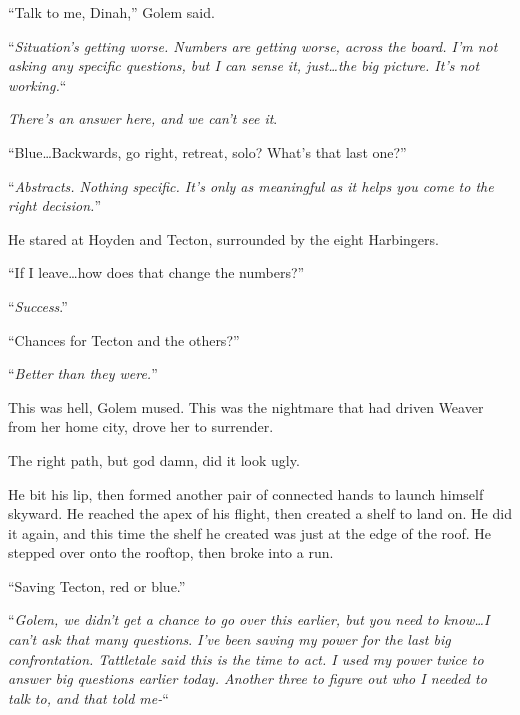 ``Talk to me, Dinah,'' Golem said.



``\emph{Situation's getting worse.  Numbers are getting worse, across the board.  I'm not asking any specific questions, but I can sense it, just\ldots the big picture.  It's not working.}``



\emph{There's an answer here, and we can't see it}.



``Blue\ldots Backwards, go right, retreat, solo?  What's that last one?''



``\emph{Abstracts.  Nothing specific.  It's only as meaningful as it helps you come to the right decision.}''



He stared at Hoyden and Tecton, surrounded by the eight Harbingers.



``If I leave\ldots how does that change the numbers?''



``\emph{Success}.''



``Chances for Tecton and the others?''



``\emph{Better than they were.}''



This was hell, Golem mused.  This was the nightmare that had driven Weaver from her home city, drove her to surrender.



The right path, but god damn, did it look ugly.



He bit his lip, then formed another pair of connected hands to launch himself skyward.  He reached the apex of his flight, then created a shelf to land on.  He did it again, and this time the shelf he created was just at the edge of the roof.  He stepped over onto the rooftop, then broke into a run.



``Saving Tecton, red or blue.''



``\emph{Golem, we didn't get a chance to go over this earlier, but you need to know\ldots I can't ask that many questions}.  \emph{I've been saving my power for the last big confrontation.  Tattletale said this is the time to act.  I used my power twice to answer big questions earlier today.  Another three to figure out who I needed to talk to, and that told me-}``



